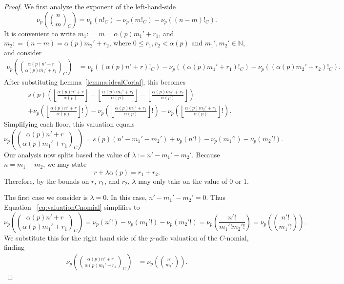 \documentclass[10pt,a4paper]{amsart}
\newcommand{\N}{\mathbb{N}}
\newcommand{\colonequal}{\mathrel{\mathop:}=}
\begin{document}
\begin{proof}
We first analyze the exponent of the left-hand-side $$\nu_p\!\left(\binom{n}{m}_C\right) = \nu_p(n!_C)-\nu_p(m!_C)-\nu_p\!\left((n-m)!_C\right).$$ 
It is convenient to write $ m_1 \colonequal m=\alpha(p) m_1' + r_1 $, and $m_2\colonequal(n-m)=\alpha(p)m_2'+r_2$, where $ 0 \leq r_1,r_2 < \alpha(p) $ and $ m_1',m_2' \in \N $, and consider
\begin{align*}
\nu_p\!\left(\binom{\alpha(p)n'+r}{\alpha(p)m_1'+r_1}_C\right) &= \nu_p\!\left((\alpha(p)n' + r)!_C\right)-\nu_p\!\left((\alpha(p)m_1' + r_1)!_C\right)-\nu_p\!\left((\alpha(p)m_2' + r_2)!_C\right).
\end{align*}
After substituting Lemma~\ref{lemma:idealCorial}, this becomes
\begin{align*}
    & s(p)\left(\left\lfloor\frac{\alpha(p)n'+r}{\alpha(p)}\right\rfloor-\left\lfloor\frac{\alpha(p)m_1'+r_1}{\alpha(p)}\right\rfloor-\left\lfloor\frac{\alpha(p)m_2' + r_2}{\alpha(p)}\right\rfloor\right) \\ & +\nu_p\left(\left\lfloor\frac{\alpha(p)n'+r}{\alpha(p)}\right\rfloor!\right) - \nu_p\left(\left\lfloor\frac{\alpha(p)m_1'+r_1}{\alpha(p)}\right\rfloor!\right) - \nu_p\left(\left\lfloor\frac{\alpha(p)m_2'+r_2}{\alpha(p)}\right\rfloor!\right).
\end{align*}
Simplifying each floor, this valuation equals
\begin{equation} \label{eq:valuationCnomial}
\nu_p\!\left(\binom{\alpha(p)n'+r}{\alpha(p)m_1'+r_1}_C\right)= s(p)\left(n'-m_1'-m_2'\right) + \nu_p\left(n'!\right) - \nu_p\left(m_1'!\right) - \nu_p\left(m_2'!\right).
\end{equation}
Our analysis now splits based the value of $\lambda:= n'-m_1'-m_2'$. 
Because $n=m_1+m_2$, we may state
$$r+\lambda\alpha(p)=r_1+r_2.$$
Therefore, by the bounds on $r$, $r_1$, and $r_2$, $\lambda$ may only take on the value of $0$ or $1$. 

The first case we consider is $\lambda=0$. In this case, $n'-m_1'-m_2'=0$. Thus Equation ~\eqref{eq:valuationCnomial} simplifies to
\begin{equation*} 
\nu_p\!\left(\binom{\alpha(p)n'+r}{\alpha(p)m_1'+r_1}_C\right)=
\nu_p\left(n'!\right) - \nu_p\left(m_1'!\right) - \nu_p\left(m_2'!\right) = \nu_p\left(\frac{n'!}{m_1'!m_2'!}\right) = \nu_p\!\left(\binom{n'!}{m_1'!}\right).
\end{equation*}
We substitute this for the right hand side of the $p$-adic valuation of the $C$-nomial, finding \begin{align*}
    \nu_p\!\left(\binom{\alpha(p)n'+r}{\alpha(p)m_1'+r_1}_C\right) &= \nu_p\!\left(\binom{n'}{m_1'}\right).
\end{align*}


\end{proof}
\end{document}
